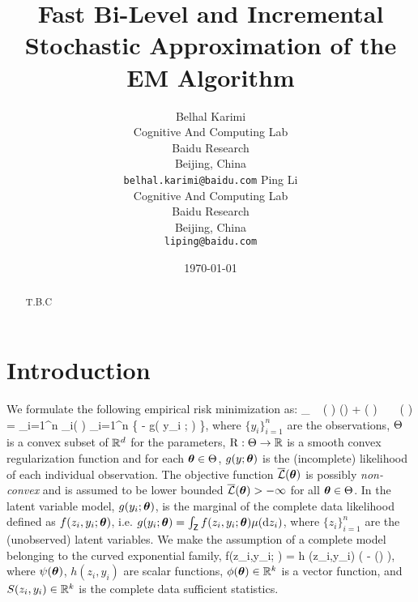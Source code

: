 \documentclass[11pt]{article}
\theoremstyle{t}
\begin{document}
\title{Fast Bi-Level and Incremental Stochastic Approximation of the EM Algorithm}
\author{
  Belhal Karimi \\
  Cognitive And Computing Lab\\
  Baidu Research\\
  Beijing, China \\
  \texttt{belhal.karimi@baidu.com} 
   \And
  Ping Li \\
  Cognitive And Computing Lab\\
  Baidu Research\\
  Beijing, China \\
  \texttt{liping@baidu.com} }
\date{\today}

\maketitle

\begin{abstract}
T.B.C
\end{abstract}


\section{Introduction}
We formulate the following empirical risk minimization as:
\beq \label{eq:em_motivate}
\min_{ \param \in \Param }~ \overline{\calL} ( \param ) \eqdef \Pen (\param) + \calL ( \param )~~~~\calL ( \param ) =  \sum_{i=1}^n \calL_i( \param) \eqdef  {} \sum_{i=1}^n \big\{ - \log g( y_i ; \param ) \big\}\eqs,
\eeq
where $\{y_i\}_{i=1}^n$ are the observations, $\Theta$ is a convex subset of $\mathbb{R}^d$ for the parameters,  $\operatorname{R} : \Theta \rightarrow \mathbb{R}$ is a smooth convex regularization function   and for each ${\bm{\theta}} \in \Theta$, $g(y;{\bm{\theta}})$ is the (incomplete) likelihood of each individual  observation.
The objective function $ \overline{{\mathcal{L}}} ( {\bm{\theta}} )$ is possibly \emph{non-convex} and is assumed to be lower bounded $ \overline{{\mathcal{L}}} ( {\bm{\theta}} ) > - \infty$ for all ${\bm{\theta}} \in \Theta$.
In the latent variable model,  $g(y_i ; {\bm{\theta}})$, is the marginal of the
complete data likelihood defined as $f(z_i,y_i; {\bm{\theta}})$, i.e. $g(y_i; {\bm{\theta}}) = \int_{\mathsf{Z}} f (z_i,y_i;{\bm{\theta}}) \mu(\mathrm d z_i)$, where $\{ z_i \}_{i=1}^n$ are the (unobserved)
latent variables.   
We make the assumption of a complete model belonging to the curved exponential family, \ie
\beq \label{eq:exp}
f(z_i,y_i; \param) = h  (z_i,y_i) \exp \big(  - \psi(\param) \big)\eqs,
\eeq
where $\psi({\bm{\theta}})$, $h(z_i,y_i)$ are scalar functions, $\phi({\bm{\theta}}) \in \mathbb{R}^k$ is a vector function, and $S(z_i,y_i) \in \mathbb{R}^k$ is the complete data sufficient statistics.
\end{document}
